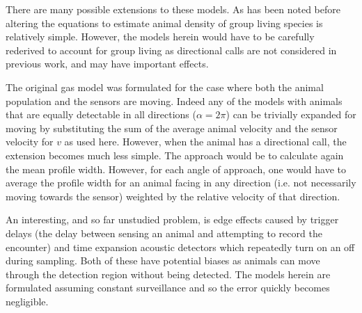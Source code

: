 \documentclass[a4paper,10pt,reqno,oneside]{amsart}
\begin{document}
There are many possible extensions to these models. As has been noted before \citep{rowcliffe2008estimating,Hutchinson_Waser_2007} altering the equations to estimate animal density of group living species is relatively simple. However, the models herein would have to be carefully rederived to account for group living as directional calls are not considered in previous work, and may have important effects.

The original gas model was formulated for the case where both the animal population and the sensors are moving. Indeed any of the models with animals that are equally detectable in all directions ($\alpha = 2\pi$) can be trivially expanded for moving by substituting the sum of the average animal velocity and the sensor velocity for $v$ as used here. However, when the animal has a directional call, the extension becomes much less simple. The approach would be to calculate again the mean profile width. However, for each angle of approach, one would have to average the profile width for an animal facing in any direction (i.e. not necessarily moving towards the sensor) weighted by the relative velocity of that direction.

An interesting, and so far unstudied problem, is edge effects caused by trigger delays (the delay between sensing an animal and attempting to record the encounter) and time expansion acoustic detectors which repeatedly turn on an off during sampling. Both of these have potential biases as animals can move through the detection region without being detected. The models herein are formulated assuming constant surveillance and so the error quickly becomes negligible.

\end{document}
